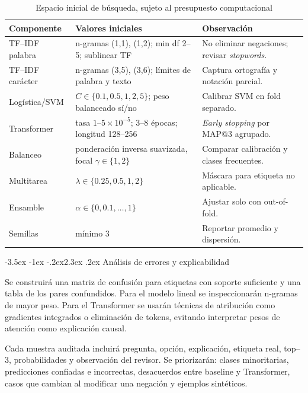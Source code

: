 \documentclass[11pt,oneside,openany]{book}
\makeatletter
\renewcommand\section{\@startsection{section}{1}{\z@}%
  {-3.5ex \@plus -1ex \@minus -.2ex}{2.3ex \@plus .2ex}%
  {\normalfont\Large\sffamily\bfseries\color{AzulMedio}}}
\makeatother
\begin{document}
\begin{table}[H]
\centering
\caption{Espacio inicial de búsqueda, sujeto al presupuesto computacional}
\label{tab:hiperparametros}
\begin{tabularx}{\textwidth}{@{}P{3.6cm}YY@{}}
\toprule
\textbf{Componente} & \textbf{Valores iniciales} & \textbf{Observación}\\
\midrule
TF--IDF palabra & n-gramas (1,1), (1,2); min df 2--5; sublinear TF & No eliminar
negaciones; revisar \emph{stopwords}.\\
TF--IDF carácter & n-gramas (3,5), (3,6); límites de palabra y texto & Captura
ortografía y notación parcial.\\
Logística/SVM & $C\in\{0.1,0.5,1,2,5\}$; peso balanceado sí/no & Calibrar SVM en
fold separado.\\
Transformer & tasa $1$--$5\times10^{-5}$; 3--8 épocas; longitud 128--256 &
\emph{Early stopping} por MAP@3 agrupado.\\
Balanceo & ponderación inversa suavizada, focal $\gamma\in\{1,2\}$ & Comparar
calibración y clases frecuentes.\\
Multitarea & $\lambda\in\{0.25,0.5,1,2\}$ & Máscara para etiqueta no aplicable.\\
Ensamble & $\alpha\in\{0,0.1,\ldots,1\}$ & Ajustar solo con out-of-fold.\\
Semillas & mínimo 3 & Reportar promedio y dispersión.\\
\bottomrule
\end{tabularx}
\end{table}

\section{Análisis de errores y explicabilidad}

Se construirá una matriz de confusión para etiquetas con soporte suficiente y una
tabla de los pares confundidos. Para el modelo lineal se inspeccionarán n-gramas de
mayor peso. Para el Transformer se usarán técnicas de atribución como gradientes
integrados o eliminación de tokens, evitando interpretar pesos de atención como
explicación causal.

Cada muestra auditada incluirá pregunta, opción, explicación, etiqueta real, top--3,
probabilidades y observación del revisor. Se priorizarán: clases minoritarias,
predicciones confiadas e incorrectas, desacuerdos entre baseline y Transformer,
casos que cambian al modificar una negación y ejemplos sintéticos.
\end{document}
